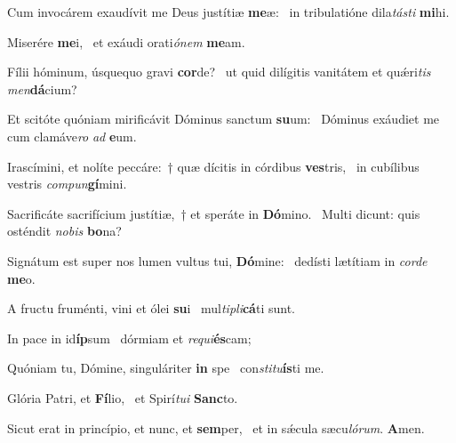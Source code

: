 \item Cum invocárem exaudívit me Deus justítiæ \textbf{me}æ:~\psstar{} in tribulatióne dila\textit{tásti} \textbf{mi}hi.
\item Miserére \textbf{me}i,~\psstar{} et exáudi orati\textit{ónem} \textbf{me}am.
\item Fílii hóminum, úsquequo gravi \textbf{cor}de?~\psstar{} ut quid dilígitis vanitátem et quǽri\textit{tis} \textit{men}\textbf{dá}cium?
\item Et scitóte quóniam mirificávit Dóminus sanctum \textbf{su}um:~\psstar{} Dóminus exáudiet me cum clamáve\textit{ro} \textit{ad} \textbf{e}um.
\item Irascímini, et nolíte peccáre:~† quæ dícitis in córdibus \textbf{ves}tris,~\psstar{} in cubílibus vestris \textit{compun}\textbf{gí}mini.
\item Sacrificáte sacrifícium justítiæ,~† et speráte in \textbf{Dó}mino.~\psstar{} Multi dicunt: quis osténdit \textit{nobis} \textbf{bo}na?
\item Signátum est super nos lumen vultus tui, \textbf{Dó}mine:~\psstar{} dedísti lætítiam in \textit{corde} \textbf{me}o.
\item A fructu fruménti, vini et ólei \textbf{su}i~\psstar{} mul\textit{tipli}\textbf{cá}ti sunt.
\item In pace in id\textbf{íp}sum~\psstar{} dórmiam et \textit{requi}\textbf{és}cam;
\item Quóniam tu, Dómine, singuláriter \textbf{in} spe~\psstar{} con\textit{stitu}\textbf{ís}ti me.
\item Glória Patri, et \textbf{Fí}lio,~\psstar{} et Spirí\textit{tui} \textbf{Sanc}to.
\item Sicut erat in princípio, et nunc, et \textbf{sem}per,~\psstar{} et in sǽcula sæcu\textit{lórum}. \textbf{A}men.
